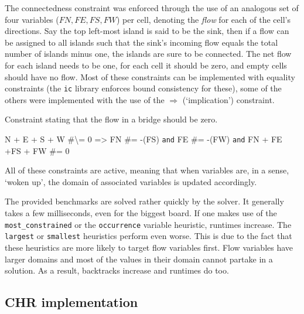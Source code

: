 The connectedness constraint was enforced through the use of an analogous set of four variables ($FN,FE,FS,FW$) per cell, denoting the \textit{flow} for each of the cell's directions. Say the top left-most island is said to be the sink, then if a flow can be assigned to all islands such that the sink's incoming flow equals the total number of islands minus one, the islands are sure to be connected. The net flow for each island needs to be one, for each cell it should be zero, and empty cells should have no flow. Most of these constraints can be implemented with equality constraints (the \texttt{ic} library enforces bound consistency for these), some of the others were implemented with the use of the \href{http://eclipseclp.org/doc/bips/lib/ic/EG-2.html}{$\Rightarrow$} (`implication') constraint.\\\par

\begin{snippet}[H]
\caption{Constraint stating that the flow in a bridge should be zero.}\label{hashi}
\small
N + E + S + W \#\textbackslash= 0 => FN \#= -(FS) \texttt{and} FE \#= -(FW) \texttt{and} FN + FE +FS + FW \#= 0
\end{snippet}

All of these constraints are active, meaning that when variables are, in a sense, `woken up', the domain of associated variables is updated accordingly.\\\par

The provided benchmarks are solved rather quickly by the solver. It generally takes a few milliseconds, even for the biggest board. If one makes use of the \texttt{most\_constrained} or the \texttt{occurrence} variable heuristic, runtimes increase. The \texttt{largest} or \texttt{smallest} heuristics perform even worse. This is due to the fact that these heuristics are more likely to target flow variables first. Flow variables have larger domains and most of the values in their domain cannot partake in a solution. As a result, backtracks increase and runtimes do too.

\subsection{CHR implementation}

